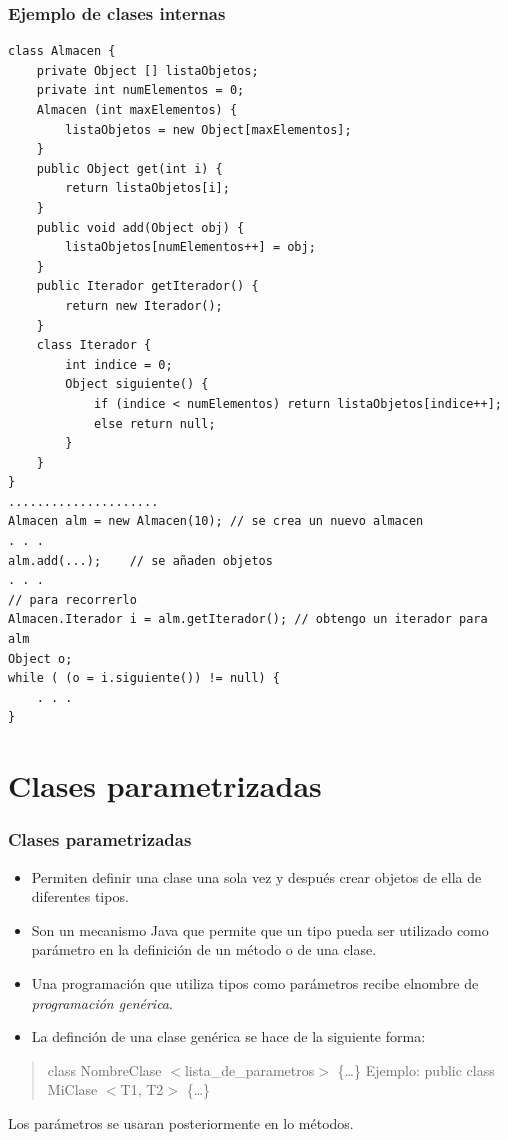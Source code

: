 \documentclass{beamer}
\begin{document}
\begin{frame}[fragile]
\frametitle{Ejemplo de clases internas}
\begin{tiny}
\begin{verbatim}
class Almacen {
    private Object [] listaObjetos;
    private int numElementos = 0;
    Almacen (int maxElementos) {
        listaObjetos = new Object[maxElementos];
    }
    public Object get(int i) {
        return listaObjetos[i];
    }
    public void add(Object obj) {
        listaObjetos[numElementos++] = obj;
    }
    public Iterador getIterador() {
        return new Iterador();
    }
    class Iterador {
        int indice = 0;
        Object siguiente() {
            if (indice < numElementos) return listaObjetos[indice++];
            else return null;
        }
    }
}
.....................
Almacen alm = new Almacen(10); // se crea un nuevo almacen
. . .
alm.add(...);    // se añaden objetos
. . .
// para recorrerlo
Almacen.Iterador i = alm.getIterador(); // obtengo un iterador para alm
Object o;
while ( (o = i.siguiente()) != null) {
    . . .
}
\end{verbatim}
\end{tiny}
\end{frame}


\section{Clases parametrizadas}

\begin{frame}
\frametitle{Clases parametrizadas}
\begin{itemize}[<+-|alert@+>]
\item Permiten definir una clase una sola vez y después crear objetos de ella de diferentes tipos.
\item Son un mecanismo Java que permite que un tipo pueda ser utilizado como parámetro en la definición de un método o de una clase.
\item Una programación que utiliza tipos como parámetros recibe elnombre de
\emph{programación genérica}.
\item La definción de una clase genérica se hace de la siguiente forma:
\end{itemize}
\pause
\begin{quote}
class NombreClase $<$lista\_de\_parametros$>$ \{\dots\}  Ejemplo:
public class MiClase $<$T1, T2$>$ \{\dots\}   
\end{quote}
\pause
Los parámetros se usaran posteriormente en lo métodos.

\end{frame}
\end{document}
